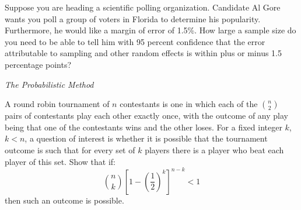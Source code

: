 \documentclass[12pt,twoside]{article}
\begin{document}
\begin{problems}


Suppose you are heading a scientific polling organization. Candidate
Al Gore wants you poll a group of voters in Florida to determine his
popularity.  Furthermore, he would like a margin of error of 1.5\%.  How
large a sample size do you need to be able to tell him with 95 percent
confidence that the error attributable to sampling and other random
effects is within plus or minus 1.5 percentage points?


\problem
{\em The Probabilistic Method}

A round robin tournament of $n$ contestants is one in which each of the
$\binom{n}{2}$
pairs of contestants play each other exactly once, with the outcome of any play
being that one of the contestants wins and the other loses. For a fixed integer
$k$, $k < n$, a question of interest is whether it is possible that the
tournament outcome is such that for every set of $k$ players there is a player
who beat each player of this set. Show that if:
\[ \binom{n}{k} \left[1 - \left(\frac{1}{2}\right)^k \right]^{n-k} < 1 \]
then such an outcome is possible.


\end{problems}
\end{document}
